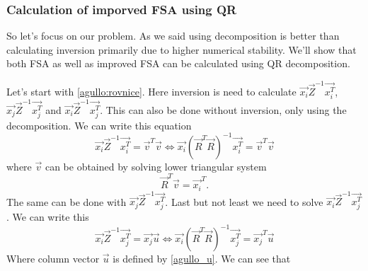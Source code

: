 


\subsubsection{Calculation of imporved FSA using QR}
So let's focus on our problem. As we said using decomposition is better than calculating inversion primarily due to higher numerical stability. 
We'll show that both FSA as well as improved FSA can be calculated using QR decomposition.

Let's start with \ref{agullo:rovnice}. Here inversion is need to calculate 
$\vec{x_i}\vec{Z}^{-1}\vec{x_i^T}$, $\vec{x_j}\vec{Z}^{-1}\vec{x_j^T}$ and $\vec{x_i}\vec{Z}^{-1}\vec{x_j^T}$. This can also be done without inversion, only using the decomposition. We can write this equation
\begin{equation} \label{solveimi}
	\vec{x_i}\vec{Z}^{-1}\vec{x_i^T} = \vec{v}^T\vec{v} 	\iff \vec{x_i}(\vec{R}^T\vec{R})^{-1}\vec{x_i^T} = \vec{v}^T\vec{v}
\end{equation} 
where $\vec{v}$ can be obtained by solving lower triangular system
\begin{equation} \label{vsolution}
	\vec{R}^T\vec{v} = \vec{x_i}^T.
\end{equation} 
The same can be done with  $\vec{x_j}\vec{Z}^{-1}\vec{x_j^T}$. Last but not least we need to solve 
$\vec{x_i}\vec{Z}^{-1}\vec{x_j^T}$. We can write this 
\begin{equation}
	\vec{x_i}\vec{Z}^{-1}\vec{x_j^T} = \vec{x_j}\vec{u} 	\iff \vec{x_i}(\vec{R}^T\vec{R})^{-1}\vec{x_j^T} = \vec{x_j}^T\vec{u}
\end{equation} 
Where column vector $\vec{u}$ is defined by \ref{agullo_u}. We can see that 

